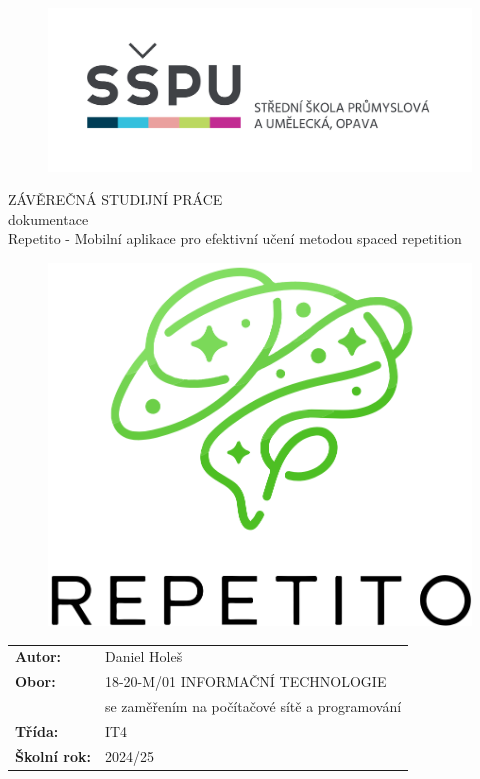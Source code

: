 \documentclass[12pt, a4paper, oneside]{report}
\title{\nazevPrace} %
\author{\jmenoAutora} %
\date{\datumOdevzdani} %
\newcommand\obor{INFORMAČNÍ TECHNOLOGIE} %
\newcommand\kodOboru{18-20-M/01} %
\newcommand\zamereni{se zaměřením na počítačové sítě a programování} %
\newcommand\trida{IT4} %
\newcommand\jmenoAutora{Daniel Holeš}  %
\newcommand\skolniRok{2024/25} %
\newcommand\nazevPrace{Repetito - Mobilní aplikace pro efektivní učení metodou spaced repetition} %
\begin{document}
	
	\pagestyle{empty}
	
	\clearpage

	
	{\selectfont
		\begin{figure}[h]
			\centering
			\includegraphics[width=0.6\linewidth]{../image/logo-skoly.png}
		\end{figure}
		
		
		{\bfseries %
			\begin{center}
				\vspace{0.025 \textheight}
				\LARGE{ZÁVĚREČNÁ STUDIJNÍ PRÁCE}\\
				\large{dokumentace}\\
				\vspace{0.075 \textheight}
				\LARGE {\nazevPrace}\\
			\end{center}  
		}%
		
		\begin{figure}[h]
			\centering
			\includegraphics[width=0.55\linewidth]{../image/screenshot-main.png}
			\label{fig:main-screen}
		\end{figure}
		
		\vspace{0.02 \textheight}
		\begin{table}[h!]
			\begin{tabular}{ll}
				\textbf{Autor:} & \jmenoAutora\\ 
				\textbf{Obor:} & \kodOboru { } \obor\\
				\textbf{} & \zamereni\\
				\textbf{Třída:} & \trida\\
				\textbf{Školní rok:} & \skolniRok\\
			\end{tabular}
			
		\end{table}		
	}
	
\end{document}
